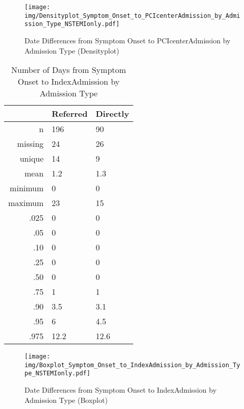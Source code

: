 \documentclass[presentation,xcolor=pdftex,dvipsnames,table,11pt]{beamer}
\begin{document}
\begin{tiny}
\begin{frame}
\begin{figure}
  \centering
  \caption{Date Differences from Symptom Onset to PCIcenterAdmission by Admission Type (Densityplot)}
  \label{Density: Date Differences from Symptom Onset to PCIcenterAdmission by Admission Type}
\texttt{[image: img/Densityplot\_Symptom\_Onset\_to\_PCIcenterAdmission\_by\_Admission\_Type\_NSTEMIonly.pdf]}\end{figure}
\end{frame}




\begin{table}[ht]
\centering
\begin{tabular}{rll}
  \toprule
 & Referred & Directly \\ 
  \midrule
n & 196 & 90 \\ 
  missing & 24 & 26 \\ 
  unique & 14 & 9 \\ 
  mean & 1.2 & 1.3 \\ 
  minimum & 0 & 0 \\ 
  maximum & 23 & 15 \\ 
  .025 & 0 & 0 \\ 
  .05 & 0 & 0 \\ 
  .10 & 0 & 0 \\ 
  .25 & 0 & 0 \\ 
  .50 & 0 & 0 \\ 
  .75 & 1 & 1 \\ 
  .90 & 3.5 & 3.1 \\ 
  .95 & 6 & 4.5 \\ 
  .975 & 12.2 & 12.6 \\ 
   \bottomrule
\end{tabular}
\caption{Number of Days from Symptom Onset to IndexAdmission by Admission Type} 
\end{table}
\begin{frame}
\begin{figure}
  \centering
  \caption{Date Differences from Symptom Onset to IndexAdmission by Admission Type (Boxplot)}
  \label{Boxplot: Date Differences from Symptom Onset to IndexAdmission by Admission Type}
\texttt{[image: img/Boxplot\_Symptom\_Onset\_to\_IndexAdmission\_by\_Admission\_Type\_NSTEMIonly.pdf]}\end{figure}
\end{frame}



\end{tiny}
\end{document}
